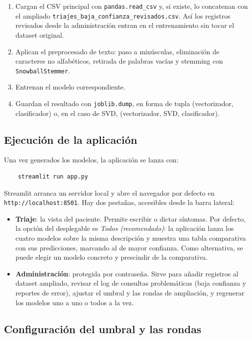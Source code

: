 \begin{enumerate}
	\item Cargan el CSV principal con \texttt{pandas.read\_csv} y, si existe, lo concatenan con el ampliado \texttt{triajes\_baja\_confianza\_revisados.csv}. Así los registros revisados desde la administración entran en el entrenamiento sin tocar el dataset original.
	\item Aplican el preprocesado de texto: paso a minúsculas, eliminación de caracteres no alfabéticos, retirada de palabras vacías y \gls{stemming} con \texttt{SnowballStemmer}.
	\item Entrenan el modelo correspondiente.
	\item Guardan el resultado con \texttt{joblib.dump}, en forma de tupla (vectorizador, clasificador) o, en el caso de SVD, (vectorizador, SVD, clasificador).
\end{enumerate}

\subsection{Ejecución de la aplicación}

Una vez generados los modelos, la aplicación se lanza con:

\begin{verbatim}
	streamlit run app.py
\end{verbatim}

Streamlit arranca un servidor local y abre el navegador por defecto en \texttt{http://localhost:8501}. Hay dos pestañas, accesibles desde la barra lateral:

\begin{itemize}
	\item \textbf{Triaje}: la vista del paciente. Permite escribir o dictar síntomas. Por defecto, la opción del desplegable es \textit{Todos (recomendado)}: la aplicación lanza los cuatro modelos sobre la misma descripción y muestra una tabla comparativa con sus predicciones, marcando al de mayor confianza. Como alternativa, se puede elegir un modelo concreto y prescindir de la comparativa.
	\item \textbf{Administración}: protegida por contraseña. Sirve para añadir registros al dataset ampliado, revisar el log de consultas problemáticas (baja confianza y reportes de error), ajustar el umbral y las rondas de ampliación, y regenerar los modelos uno a uno o todos a la vez.
\end{itemize}

\subsection{Configuración del umbral y las rondas}

